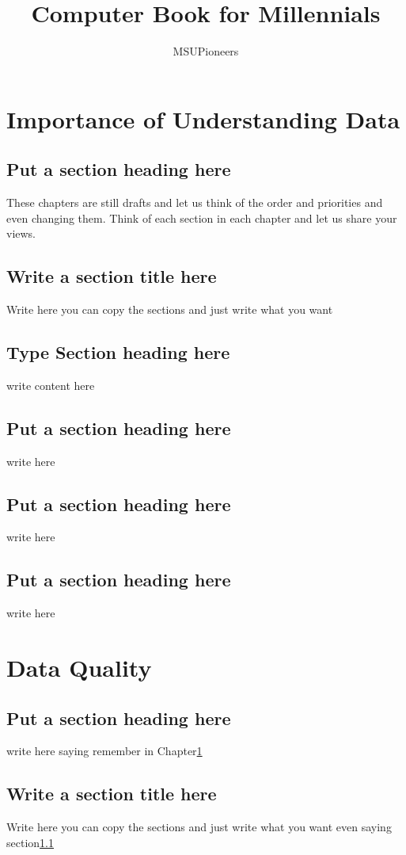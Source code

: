 \documentclass[a4paper,twoside]{scrbook}
\begin{document}
\title{Computer Book for Millennials}
\author{MSUPioneers}
\frontmatter
\maketitle
\tableofcontents
\mainmatter
\chapter{Importance of Understanding Data}\label{ch1}
\section{Put a section heading here}\label{1.1}
These chapters are still drafts and let us think of the order and priorities and even changing them.
Think of each section in each chapter and let us share your views.
\section{Write a section title here}
Write here you can copy the sections and just write what you want
\section{Type Section heading here}
write content here
\section{Put a section heading here}
write here 
\section{Put a section heading here}
write here
\section{Put a section heading here}
write here
\chapter{Data Quality}\label{ch2}
\section{Put a section heading here}
write here saying remember in Chapter\ref{ch1}
\section{Write a section title here}
Write here you can copy the sections and just write what you want even saying section\ref{1.1}
\end{document}
